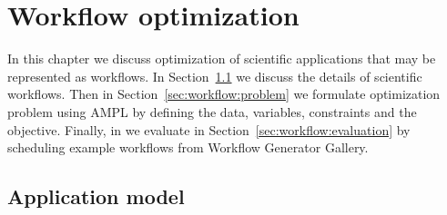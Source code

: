 { %


\newcommand{\INSTANCE}{I}
\newcommand{\STORAGE}{S}
\newcommand{\PROVIDER}{P}
\newcommand{\PROVIDERINSTANCES}{PI}
\newcommand{\LOCALSTORAGE}{LS}

\newcommand{\LAYER}{L}
\newcommand{\TASK}{G}


\newcommand{\instancePrice}{p^I}
\newcommand{\ccu}{ccu}
\newcommand{\instanceTransferPriceIn}{p^{Iin}}
\newcommand{\instanceTransferPriceOut}{p^{Iout}}
\newcommand{\storageTransferPriceOut}{p^{Sout}}
\newcommand{\storageTransferPriceIn}{p^{Sin}}
\newcommand{\transferRate}{r}


\newcommand{\taskCount}{A^{tot}}
\newcommand{\transferTime}{t^{net}}
\newcommand{\execTime}{t^x}
\newcommand{\dataSizeIn}{d^{in}}
\newcommand{\dataSizeOut}{d^{out}}
\newcommand{\requestPrice}{p^{R}}
\newcommand{\workflowDeadline}{t^D}
\newcommand{\instanceDeadline}{t^d}
\newcommand{\unitTime}{t^u}
\newcommand{\transferCost}{c^T}
\newcommand{\tasksPerDeadline}{a^d}
\newcommand{\timeQuantum}{t^q}
\newcommand{\tasksPerTimeQuantum}{a^q}
\newcommand{\providerMaxMachines}{n^{Pmax}}
\newcommand{\instanceMaxMachines}{n^{Imax}}

\newcommand{\NumberInstances}{N}
\newcommand{\TaskAssignment}{A}
\newcommand{\DataAssignment}{D}
\newcommand{\TailTaskHours}{R}
\newcommand{\HasTail}{H}

\newcommand{\instanceSet}{I^{idx}}
\newcommand{\InstanceTasks}{T}
\newcommand{\InstanceHours}{H}
\newcommand{\InstanceActive}{A}
\newcommand{\LayerDeadline}{D}
\newcommand{\LayerTime}{D^t}

\chapter{Workflow optimization}
\label{chap:formulation-workflows} 

    In this chapter we discuss optimization of scientific applications that may be represented as workflows. In Section \ref{sec:workflow:appmodel} we discuss the details of scientific workflows. Then in Section \ref{sec:workflow:problem} we formulate optimization problem using AMPL by defining the data, variables, constraints and the objective. Finally, in we evaluate in Section \ref{sec:workflow:evaluation} by scheduling example workflows from Workflow Generator Gallery.
  
    \section{Application model}
    \label{sec:workflow:appmodel}
    
}
